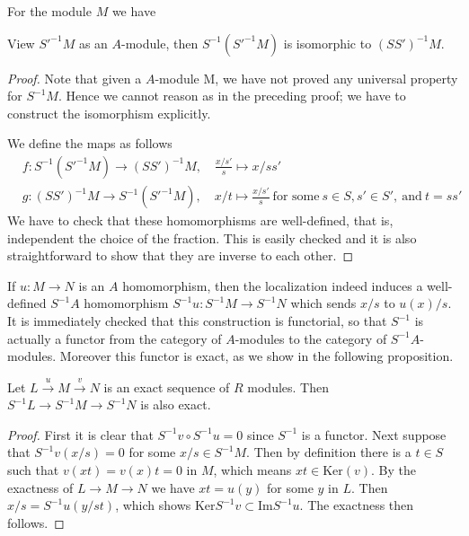 \noindent
For the module $M$ we have

\begin{proposition}
\label{proposition-localize-twice-module}
View $S'^{-1}M$ as an $A$-module, then $S^{-1}(S'^{-1}M)$ is
isomorphic to $(SS')^{-1}M$.
\end{proposition}

\begin{proof}
Note that given a $A$-module M, we have not proved any
universal property for $S^{-1}M$. Hence we cannot reason
as in the preceding proof; we have to construct the isomorphism explicitly.

\medskip\noindent
We define the maps as follows
\begin{align*}
&f : S^{-1}(S'^{-1}M) \longrightarrow (SS')^{-1}M, \quad \frac{x/s'}{s}\mapsto
x/ss'\\
&g : (SS')^{-1}M \longrightarrow S^{-1}(S'^{-1}M), \quad x/t\mapsto
\frac{x/s'}{s}\ \text{for some}\ s\in S, s'\in S', \ \text{and}\ 
t = ss'
\end{align*}
We have to check that these homomorphisms are well-defined, that is,
independent the choice of the fraction. This is easily checked and it is also
straightforward to show that they are inverse to each other.
\end{proof}

\noindent
If $u : M\rightarrow N$ is an $A$ homomorphism, then the localization indeed
induces a well-defined $S^{-1}A$ homomorphism $S^{-1}u : S^{-1}M\rightarrow
S^{-1}N$ which sends $x/s$ to $u(x)/s$. It is immediately checked that
this construction is functorial, so that $S^{-1}$
is actually a functor from the category of $A$-modules to the
category of $S^{-1}A$-modules. Moreover this functor is exact,
as we show in the following proposition.

\begin{proposition}
\label{proposition-localization-exact}
Let $L\xrightarrow{u} M\xrightarrow{v} N$ is an exact sequence
of $R$ modules. Then
$S^{-1}L\rightarrow S^{-1}M\rightarrow S^{-1}N$ is also exact.
\end{proposition}

\begin{proof}
First it is clear that $S^{-1}v\circ S^{-1}u = 0$ since $S^{-1}$ is a
functor. Next suppose that $S^{-1}v(x/s) = 0$ for some $x/s\in
S^{-1}M$. Then by definition there is a $t\in S$ such that
$v(xt) = v(x)t = 0$ in $M$, which means $xt\in\text{Ker}(v)$.
By the exactness of $L\rightarrow M\rightarrow
N$ we have $xt = u(y)$ for some $y$ in $L$. Then $x/s = S^{-1}u(y/st)$,
which shows $\text{Ker} S^{-1}v\subset\text{Im} S^{-1}u$. The exactness then
follows.
\end{proof}

